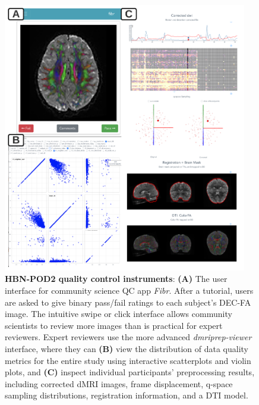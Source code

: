 \documentclass[fleqn,10pt,inline]{wlscirep}
\begin{document}
\begin{figure}[tbp]
    \includegraphics[width=0.95\textwidth]{hbn-pod2-qc-instruments.pdf}
    \caption{
        {\bf HBN-POD2 quality control instruments}:
        {\bf (A)} The user interface for community science QC app \emph{Fibr}. After a
        tutorial, users are asked to give binary pass/fail ratings to
        each subject's DEC-FA image. The
        intuitive swipe or click interface allows community scientists to
        review more images than is practical for expert reviewers. Expert
        reviewers use the more advanced \emph{dmriprep-viewer} interface, where
        they can
        {\bf (B)} view the distribution of data quality metrics for the entire
        study using interactive scatterplots and violin plots, and
        {\bf (C)} inspect individual participants' preprocessing results,
        including corrected dMRI images, frame displacement, q-space
        sampling distributions, registration information, and a DTI
        model.
        \label{fig:web-apps}
    }
\end{figure}
\end{document}
